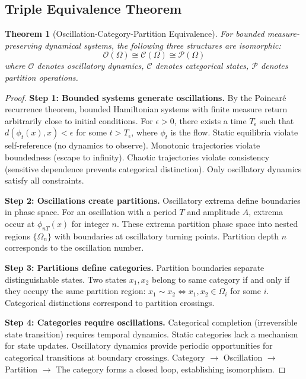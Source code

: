 \documentclass[11pt,a4paper]{article}
\newtheorem{theorem}{Theorem}[section]
\theoremstyle{remark}
\begin{document}
\subsection{Triple Equivalence Theorem}

\begin{theorem}[Oscillation-Category-Partition Equivalence]
\label{thm:triple_equiv}
For bounded measure-preserving dynamical systems, the following three structures are isomorphic:
\begin{equation}
\mathcal{O}(\Omega) \cong \mathcal{C}(\Omega) \cong \mathcal{P}(\Omega)
\end{equation}
where $\mathcal{O}$ denotes oscillatory dynamics, $\mathcal{C}$ denotes categorical states, $\mathcal{P}$ denotes partition operations.
\end{theorem}

\begin{proof}
\textbf{Step 1: Bounded systems generate oscillations.} By the Poincaré recurrence theorem, bounded Hamiltonian systems with finite measure return arbitrarily close to initial conditions. For $\epsilon > 0$, there exists a time $T_{\epsilon}$ such that $d(\phi_t(x), x) < \epsilon$ for some $t > T_{\epsilon}$, where $\phi_t$ is the flow. Static equilibria violate self-reference (no dynamics to observe). Monotonic trajectories violate boundedness (escape to infinity). Chaotic trajectories violate consistency (sensitive dependence prevents categorical distinction). Only oscillatory dynamics satisfy all constraints.

\textbf{Step 2: Oscillations create partitions.} Oscillatory extrema define boundaries in phase space. For an oscillation with a period $T$ and amplitude $A$, extrema occur at $\phi_{nT}(x)$ for integer $n$. These extrema partition phase space into nested regions $\{\Omega_n\}$ with boundaries at oscillatory turning points. Partition depth $n$ corresponds to the oscillation number.

\textbf{Step 3: Partitions define categories.} Partition boundaries separate distinguishable states. Two states $x_1, x_2$ belong to same category if and only if they occupy the same partition region: $x_1 \sim x_2 \iff x_1, x_2 \in \Omega_i$ for some $i$. Categorical distinctions correspond to partition crossings.

\textbf{Step 4: Categories require oscillations.} Categorical completion (irreversible state transition) requires temporal dynamics. Static categories lack a mechanism for state updates. Oscillatory dynamics provide periodic opportunities for categorical transitions at boundary crossings. Category $\to$ Oscillation $\to$ Partition $\to$ The category forms a closed loop, establishing isomorphism.
\end{proof}
\end{document}
